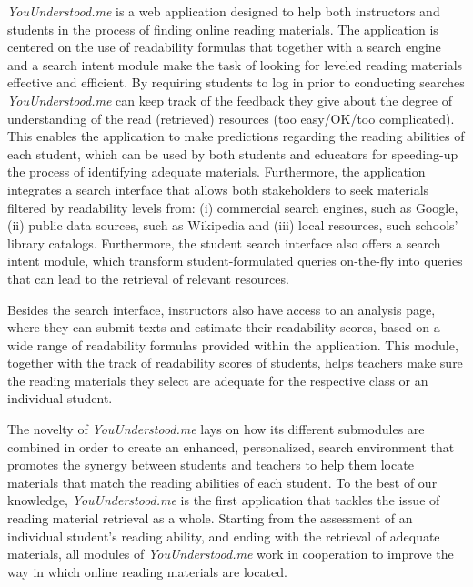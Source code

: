 \documentclass{sig-alternate-05-2015}
\begin{document}

\textit{YouUnderstood.me} is a web application designed to help  both instructors and students in the process of finding online reading materials. The application is centered on the use of readability formulas that together with a search engine and a search intent module make the task of looking for leveled reading materials effective and efficient. By requiring students to log in prior to conducting searches \textit{YouUnderstood.me} can keep track of the feedback they give about the degree of understanding of the read (retrieved) resources (too easy/OK/too complicated). This enables the application to make predictions regarding the reading abilities of each student, which can be used by both students and educators for speeding-up the process of identifying adequate materials. Furthermore, the application integrates a search interface that allows both stakeholders to seek materials filtered by readability levels from: (i) commercial search engines, such as Google, (ii) public data sources, such as Wikipedia and (iii) local resources, such schools' library catalogs. Furthermore, the student search interface also offers a search intent module,
which transform student-formulated queries on-the-fly into queries that can lead to the retrieval of relevant resources. 


Besides the search interface, instructors also have access to an analysis page, where they can submit texts and estimate their readability scores, based on a wide range of readability formulas provided within the application. This module, together with the track of readability scores of students, helps teachers make sure the reading materials they select are adequate for the respective class or an individual student.

The novelty of \textit{YouUnderstood.me} lays on how its different submodules are combined in order to create an enhanced, personalized, search environment that promotes the synergy between students and teachers to help them locate materials that match the reading abilities of each student.
To the best of our knowledge, \textit{YouUnderstood.me} is the first application that tackles the issue of reading material retrieval as a whole. Starting from the assessment of an individual student's reading ability, and ending with the retrieval of adequate materials, all modules of \textit{YouUnderstood.me} work in cooperation to improve the way in which online reading materials are located.
\end{document}
